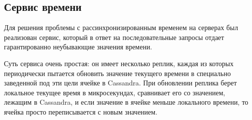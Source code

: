 \subsection{Сервис времени}

Для решения проблемы с рассинхронизированным временем на серверах был реализован сервис, который в ответ на последовательные запросы отдает гарантированно неубывающие значения времени.

Суть сервиса очень простая: он имеет несколько реплик, каждая из которых периодически пытается обновить значение текущего времени в специально заведенной под эти цели ячейке в Cassandra. При обновлении реплика берет локальное текущее время в микросекундах, сравнивает его со значением, лежащим в Cassandra, и если значение в ячейке меньше локального времени, то ячейка просто переписывается с новым значением.
